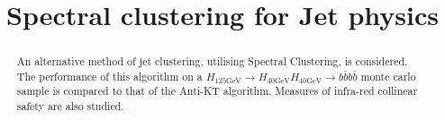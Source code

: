 \documentclass{article}
\begin{document}
\title{Spectral clustering for Jet physics}
	
	\maketitle
	
    \FloatBarrier
    \begin{abstract}
        An alternative method of jet clustering, utilising Spectral Clustering, is considered.
        The performance of this algorithm on a \(H_{125\text{GeV}} \rightarrow H_{40\text{GeV}} H_{40\text{GeV}} \rightarrow b \bar{b} b \bar{b}\)
        monte carlo sample is compared to that of the Anti-KT algorithm.
        Measures of infra-red collinear safety are also studied.
	\end{abstract}
     
    \FloatBarrier
    \FloatBarrier
    
    \FloatBarrier
    
    \FloatBarrier
    
    \FloatBarrier
    
    \FloatBarrier
    
    \FloatBarrier
    \printbibliography	
\end{document}
